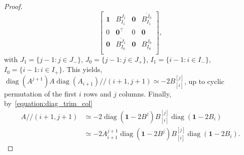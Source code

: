 \documentclass[11pt,a4paper]{amsart}
\theoremstyle{plain}
\theoremstyle{definition}
\newcommand{\trim}{/\!\!/}
\DeclareMathOperator{\diag}{diag}
\begin{document}
\begin{proof}
$$\begin{bmatrix}
\mathbf{1} & B_{I_1}^{J_1} &\mathbf{0}& \overline{B_{I_1}^{J_0}} \\
0 & \mathbf{0}^\top & 0 &\mathbf{0}\\
\mathbf{0} & \overline{B_{I_0}^{J_1}} &\mathbf{0}& B_{I_0}^{J_0} \\
\end{bmatrix},$$
with $J_1 = \{j-1\colon j\in J_-\}$, $J_0 = \{j-1\colon j\in J_+\}$, $I_1 = \{i-1\colon i\in I_-\}$, $I_0 = \{i-1\colon i\in I_+\}$.
This yields, $\diag(A^{j+1})A\diag(A_{i+1})\trim(i+1,j+1) \simeq -2 B_{[i]}^{[j]}$, up to cyclic permutation of the first $i$ rows and $j$ columns.
Finally, by~\eqref{equation:diag_trim_col}
\begin{align*}
A\trim(i+1,j+1) &\simeq -2 \diag(\mathbf{1} -2 B^j) B_{[i]}^{[j]}\diag(\mathbf{1}-2 B_i)\\
& \simeq -2 A_{i+1}^{j+1} \diag(\mathbf{1} -2 B^j) B_{[i]}^{[j]}\diag(\mathbf{1}-2 B_i).
\end{align*}


\end{proof}
\end{document}

